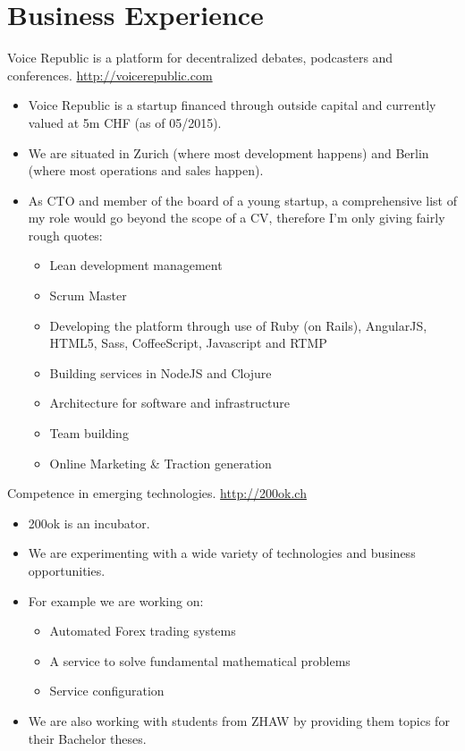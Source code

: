 \documentclass[10pt,a4paper]{moderncv}
\begin{document}
\maketitle

\section{Business Experience}
{Voice Republic is a platform for decentralized debates, podcasters and conferences.
\newline
\url{http://voicerepublic.com}
\newline
\begin{itemize}
  \item Voice Republic is a startup financed through outside capital and
  currently valued at 5m CHF (as of 05/2015).
  \item We are situated in Zurich (where most development happens) and Berlin
  (where most operations and sales happen).
  \item As CTO and member of the board of a young startup, a comprehensive list
  of my role would go beyond the scope of a CV, therefore I'm only giving
  fairly rough quotes:
  \begin{itemize}
    \item Lean development management
    \item Scrum Master
    \item Developing the platform through use of Ruby (on Rails), AngularJS,
    HTML5, Sass, CoffeeScript, Javascript and RTMP
    \item Building services in NodeJS and Clojure
    \item Architecture for software and infrastructure
    \item Team building
    \item Online Marketing \& Traction generation
  \end{itemize}
\end{itemize}}

{Competence in emerging technologies.
\newline
\url{http://200ok.ch}
\newline
\begin{itemize}
  \item 200ok is an incubator.
  \item We are experimenting with a wide variety of technologies and business
  opportunities.
  \item For example we are working on:
  \begin{itemize}
    \item Automated Forex trading systems
    \item A service to solve fundamental mathematical problems
    \item Service configuration
  \end{itemize}
  \item We are also working with students from ZHAW by providing them topics
  for their Bachelor theses.
\end{itemize}}
\end{document}
